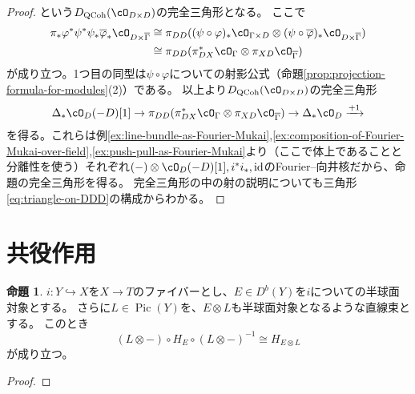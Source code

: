 \documentclass[uplatex, a4paper, dvipdfmx]{jsarticle}
\theoremstyle{definition}
\newtheorem{proposition}[theorem]{命題}
\DeclareMathOperator{\id}{\mathrm{id}}
\DeclareMathOperator{\Pic}{\mathrm{Pic}}
\DeclareMathOperator{\QCoh}{\mathrm{QCoh}}
\begin{document}
\begin{proof}
    という$D_{\QCoh}(\cO_{D \times D})$の完全三角形となる。
    ここで
    \begin{align}
        \pi_*\varphi^*\psi^*\psi_*\overline{\varphi}_*\cO_{D \times \overline{\Gamma}} & \cong \pi_{DD}((\psi \circ \varphi)_*\cO_{\Gamma \times D} \otimes (\psi \circ \overline{\varphi})_*\cO_{D \times \overline{\Gamma}}) \\
                                                                                       & \cong \pi_{DD}(\pi_{DX}^*\cO_{\Gamma} \otimes \pi_{XD}\cO_{\overline{\Gamma}})
    \end{align}
    が成り立つ。1つ目の同型は$\psi \circ \varphi$についての射影公式（命題\ref{prop:projection-formula-for-modules}(2)）である。
    以上より$D_{\QCoh}(\cO_{D \times D})$の完全三角形
    \begin{equation}\label{eq:triangle-on-DD}
        \Delta_*\cO_D(-D)[1] \to \pi_{DD}(\pi_{DX}^*\cO_{\Gamma} \otimes \pi_{XD}\cO_{\overline{\Gamma}}) \to \Delta_*\cO_D \xrightarrow{+1}
    \end{equation}
    を得る。これらは例\ref{ex:line-bundle-as-Fourier-Mukai},\ref{ex:composition-of-Fourier-Mukai-over-field},\ref{ex:push-pull-as-Fourier-Mukai}より（ここで体上であることと分離性を使う）それぞれ$(-)\otimes \cO_D(-D)[1], i^*i_*, \id$のFourier--向井核だから、命題の完全三角形を得る。
    完全三角形の中の射の説明についても三角形\eqref{eq:triangle-on-DDD}の構成からわかる。
\end{proof}

\section{共役作用}
\begin{proposition}
    $i \colon Y \hookrightarrow X$を$X \to T$のファイバーとし、$E \in D^b(Y)$を$i$についての半球面対象とする。
    さらに$L \in \Pic(Y)$を、$E \otimes L$も半球面対象となるような直線束とする。
    このとき
    \begin{equation}
        (L \otimes -) \circ H_E \circ (L \otimes -)^{-1} \cong H_{E\otimes L}
    \end{equation}
    が成り立つ。
\end{proposition}
\begin{proof}
\end{proof}
\printbibliography[title=参考文献]
\end{document}
